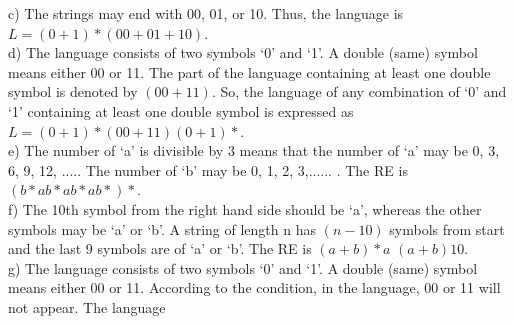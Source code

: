 \documentclass[8pt]{beamer}
\begin{document}
\begin{frame}
c) The strings may end with 00, 01, or 10. Thus, the language is $L = (0+1)*(00 + 01+10)$.\\
d) The language consists of two symbols ‘0’ and ‘1’. A double (same) symbol means either 00
or 11. The part of the language containing at least one double symbol is denoted by $(00 + 11)$.
So, the language of any combination of ‘0’ and ‘1’ containing at least one double symbol is
expressed as $L = (0+1)* (00+11) (0+1)*$.\\
e) The number of ‘a’ is divisible by 3 means that the number of ‘a’ may be 0, 3, 6, 9, 12, .....
The number of ‘b’ may be 0, 1, 2, 3,...... . The RE is $(b*ab*ab*ab*)*$.\\
f) The 10th symbol from the right hand side should be ‘a’, whereas the other symbols may be ‘a’
or ‘b’. A string of length n has $(n-10)$ symbols from start and the last 9 symbols are of ‘a’ or
‘b’. The RE is $(a + b)*a$ $(a + b)10$.\\
g) The language consists of two symbols ‘0’ and ‘1’. A double (same) symbol means either 00
or 11. According to the condition, in the language, 00 or 11 will not appear. The language\\
\end{frame}
\end{document}
